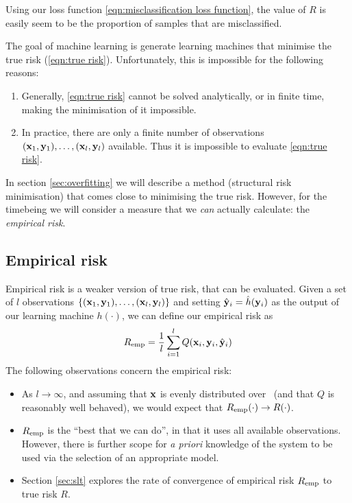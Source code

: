 Using our loss function \ref{eqn:misclassification loss function}, the
value of $R$ is easily seem to be the proportion of samples that are
misclassified.

The goal of machine learning is generate learning machines that
minimise the true risk (\ref{eqn:true risk}).  Unfortunately, this is
impossible for the following reasons:
%
\begin{enumerate}
\item	Generally, \ref{eqn:true risk} cannot be solved analytically,
	or in finite time, making the minimisation of it impossible.
%
\item	In practice, there are only a finite number of observations
	$(\mathbf{x}_1, \mathbf{y}_1), \ldots, (\mathbf{x}_l, \mathbf{y}_l)$ available.  Thus
	it is impossible to evaluate \ref{eqn:true risk}.
\end{enumerate}
%
In section \ref{sec:overfitting} we will describe a method (structural
risk minimisation) that comes close to minimising the true risk.
However, for the timebeing we will consider a measure that we
\emph{can} actually calculate: the \emph{empirical risk}.


\subsection{Empirical risk}
\label{sec:empirical risk}
Empirical risk is a weaker version of true risk, that can be
evaluated.  Given a set of $l$ observations
$\{(\mathbf{x}_1, \mathbf{y}_1), \ldots, (\mathbf{x}_l, \mathbf{y}_l)\}$ and setting $\hat{\mathbf{y}}_i
= \hat{h}(\mathbf{y}_i)$ as the output of our learning machine $h(\cdot)$,
we can define our empirical risk as 
%
\begin{equation}
R_{\mathrm{emp}} = \frac{1}{l} \sum_{i=1}^{l} Q(\mathbf{x}_i, \mathbf{y}_i, \hat{\mathbf{y}}_i)
\end{equation}
%
The following observations concern the empirical risk:
%
\begin{itemize}
\item 	As $l \rightarrow \infty$, and assuming that $\mathbf{x}$ is evenly
	distributed over \calI\, (and that $Q$ is reasonably well
	behaved), we would expect that $R_{\mathrm{emp}}(\cdot) \rightarrow
	R(\cdot)$.

\item	$R_{\mathrm{emp}}$ is the ``best that we can do'', in that it uses all
	available observations.  However, there is further scope for
	\emph{a priori} knowledge of the system to be used via the
	selection of an appropriate model.

\item	Section \ref{sec:slt} explores the rate of convergence of
	empirical risk $R_{\mathrm{emp}}$ to true risk $R$.
\end{itemize}


